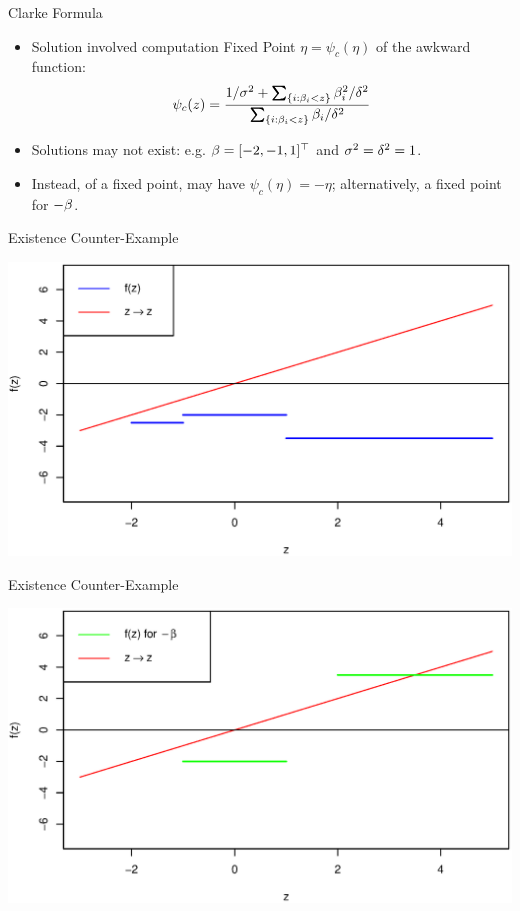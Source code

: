 \documentclass[11pt,leqno]{beamer}
\begin{document}
\begin{frame}{Clarke Formula}
\begin{itemize}
\item Solution involved computation Fixed Point $\eta = \psi_c(\eta)$ of the awkward function:
\begin{equation}
 \psi_{c}(z) = \frac{1/\gs^2 + \sum_{\{i: \gb_i<z\}} \gb_i^2/\gd^2 }{ \sum_{\{i: \gb_i<z\}} \gb_i/\gd^2 }
\end{equation}

\item Solutions may not exist: e.g. $\beta = [-2,-1,1]^\top$ and $\sigma^2 = \delta^2 = 1$.
\item Instead, of a fixed point, may have $\psi_c(\eta) = -\eta$; alternatively, a fixed point for $-\beta$.
\end{itemize}
\end{frame}
\begin{frame}{Existence Counter-Example}
\begin{centering}
\includegraphics[scale=.5]{Clarke_Plot.eps}
\end{centering}
\end{frame}
\begin{frame}{Existence Counter-Example}
\begin{centering}
\includegraphics[scale=.5]{Clarke_Plot2.eps}
\end{centering}
\end{frame}
\end{document}
